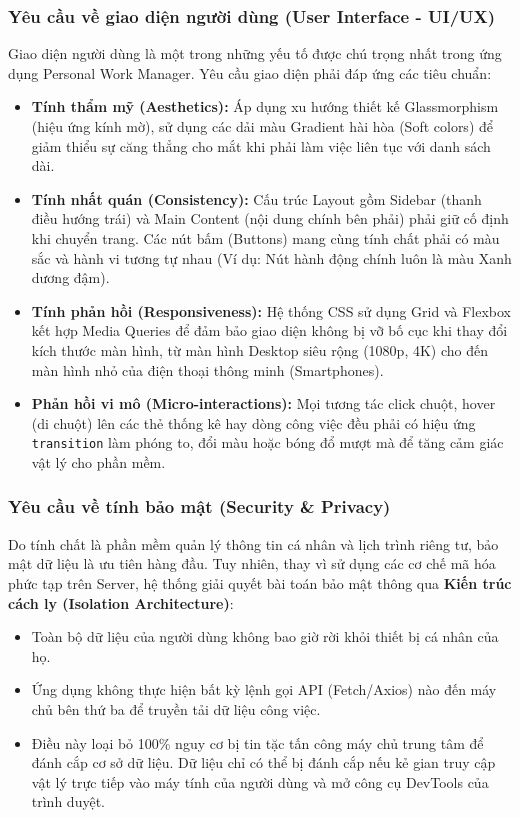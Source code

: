 \subsubsection{Yêu cầu về giao diện người dùng (User Interface - UI/UX)}
Giao diện người dùng là một trong những yếu tố được chú trọng nhất trong ứng dụng Personal Work Manager. Yêu cầu giao diện phải đáp ứng các tiêu chuẩn:
\begin{itemize}
    \item \textbf{Tính thẩm mỹ (Aesthetics):} Áp dụng xu hướng thiết kế Glassmorphism (hiệu ứng kính mờ), sử dụng các dải màu Gradient hài hòa (Soft colors) để giảm thiểu sự căng thẳng cho mắt khi phải làm việc liên tục với danh sách dài.
    \item \textbf{Tính nhất quán (Consistency):} Cấu trúc Layout gồm Sidebar (thanh điều hướng trái) và Main Content (nội dung chính bên phải) phải giữ cố định khi chuyển trang. Các nút bấm (Buttons) mang cùng tính chất phải có màu sắc và hành vi tương tự nhau (Ví dụ: Nút hành động chính luôn là màu Xanh dương đậm).
    \item \textbf{Tính phản hồi (Responsiveness):} Hệ thống CSS sử dụng Grid và Flexbox kết hợp Media Queries để đảm bảo giao diện không bị vỡ bố cục khi thay đổi kích thước màn hình, từ màn hình Desktop siêu rộng (1080p, 4K) cho đến màn hình nhỏ của điện thoại thông minh (Smartphones).
    \item \textbf{Phản hồi vi mô (Micro-interactions):} Mọi tương tác click chuột, hover (di chuột) lên các thẻ thống kê hay dòng công việc đều phải có hiệu ứng \texttt{transition} làm phóng to, đổi màu hoặc bóng đổ mượt mà để tăng cảm giác vật lý cho phần mềm.
\end{itemize}

\subsubsection{Yêu cầu về tính bảo mật (Security \& Privacy)}
Do tính chất là phần mềm quản lý thông tin cá nhân và lịch trình riêng tư, bảo mật dữ liệu là ưu tiên hàng đầu. Tuy nhiên, thay vì sử dụng các cơ chế mã hóa phức tạp trên Server, hệ thống giải quyết bài toán bảo mật thông qua \textbf{Kiến trúc cách ly (Isolation Architecture)}:
\begin{itemize}
    \item Toàn bộ dữ liệu của người dùng không bao giờ rời khỏi thiết bị cá nhân của họ.
    \item Ứng dụng không thực hiện bất kỳ lệnh gọi API (Fetch/Axios) nào đến máy chủ bên thứ ba để truyền tải dữ liệu công việc.
    \item Điều này loại bỏ 100\% nguy cơ bị tin tặc tấn công máy chủ trung tâm để đánh cắp cơ sở dữ liệu. Dữ liệu chỉ có thể bị đánh cắp nếu kẻ gian truy cập vật lý trực tiếp vào máy tính của người dùng và mở công cụ DevTools của trình duyệt.
\end{itemize}

